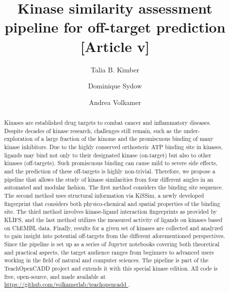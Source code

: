 \documentclass[9pt,training]{livecoms}
\title{Kinase similarity assessment pipeline for off-target prediction [Article v\versionnumber]}
\author[1\authfn{1}]{Talia B. Kimber}
\author[1\authfn{1}\authfn{2}]{Dominique Sydow}
\author[1*]{Andrea Volkamer}
\affil[1]{\textit{In silico} Toxicology and Structural Bioinformatics, Institute of Physiology, Charit\'e-Universit\"atsmedizin Berlin, Charit\'eplatz 1, 10117, Berlin, Germany}
\begin{document}
\begin{frontmatter}
\maketitle

\begin{abstract}
Kinases are established drug targets to combat cancer and inflammatory diseases. Despite decades of kinase research, challenges still remain, such as the under-exploration of a large fraction of the kinome and the promiscuous binding of many kinase inhibitors. Due to the highly conserved orthosteric ATP binding site in kinases, ligands may bind not only to their designated kinase (on-target) but also to other kinases (off-targets). Such promiscuous binding can cause mild to severe side effects, and the prediction of these off-targets is highly non-trivial.
Therefore, we propose a pipeline that allows the study of kinase similarities from four different angles in an automated and modular fashion. The first method considers the binding site sequence. The second method uses structural information via KiSSim, a newly developed fingerprint that considers both physico-chemical and spatial properties of the binding site. The third method involves kinase-ligand interaction fingerprints as provided by KLIFS, and the last method utilizes the measured activity of ligands on kinases based on ChEMBL data. Finally, results for a given set of kinases are collected and analyzed to gain insight into potential off-targets from the different aforementioned perspectives. Since the pipeline is set up as a series of Jupyter notebooks covering both theoretical and practical aspects, the target audience ranges from beginners to advanced users working in the field of natural and computer sciences. The pipeline is part of the TeachOpenCADD project and extends it with this special kinase edition. All code is free, open-source, and made available at \href{https://github.com/volkamerlab/teachopencadd
}{https://github.com/volkamerlab/teachopencadd
}.
\end{abstract}

\end{frontmatter}
\end{document}
